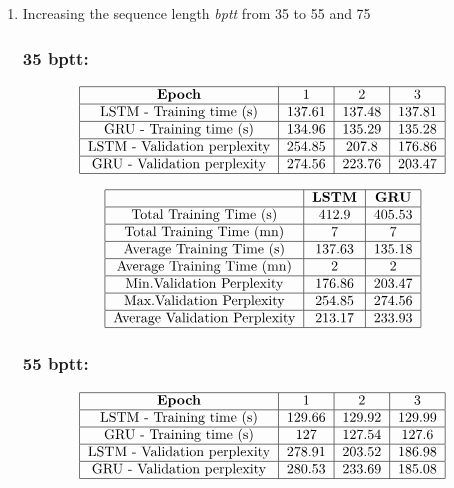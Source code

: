 \documentclass[11pt]{article}
\newcommand{\0}{\mat{0}}
\begin{document}
\begin{itemize}
\begin{enumerate}
	\item Increasing the sequence length \textit{bptt} from 35 to 55 and 75
	\subsubsection*{\textbf{35 bptt:}}
	  \[
  	 	\begin{tabular}{| c | c | c | c |}
  	 	 	\hline
	 	 		\textbf{Epoch} & 1 & 2 & 3  \\
	  	 	\hline
	 			LSTM - Training time (s)		& 137.61 & 137.48 & 137.81 \\
	 	 	\hline
				GRU - Training time (s)		& 134.96& 135.29 & 135.28 \\
			\hline 
				LSTM - Validation perplexity	& 254.85 & 207.8 & 176.86 \\
			\hline 
				GRU - Validation perplexity	& 274.56 & 223.76 & 203.47 \\
			\hline
		\end{tabular}
	\] 

	  \[
  	 	\begin{tabular}{| c | c | c |}
  	 	 	\hline
	 	 		& \textbf{LSTM} &  \textbf{GRU} \\
	  	 	\hline
	 			Total Training Time (s)		& 412.9 & 405.53 \\
	 	 	\hline
				Total Training Time (mn)		& 7 & 7 \\
			\hline 
				Average Training Time (s)	 	& 137.63 & 135.18 \\
			\hline 
				Average Training Time (mn)	& 2 & 2 \\
			\hline
				Min.Validation Perplexity		& 176.86 & 203.47 \\
			\hline
				Max.Validation Perplexity		& 254.85 & 274.56 \\
			\hline
				Average Validation Perplexity	& 213.17 & 233.93 \\
			\hline
		\end{tabular}
	\] 

	\subsubsection*{\textbf{55 bptt:}}
	  \[
  	 	\begin{tabular}{| c | c | c | c |}
  	 	 	\hline
	 	 		\textbf{Epoch} & 1 & 2 & 3  \\
	  	 	\hline
	 			LSTM - Training time (s)		& 129.66 & 129.92 & 129.99 \\
	 	 	\hline
				GRU - Training time (s)		& 127	& 127.54 & 127.6 \\
			\hline 
				LSTM - Validation perplexity	& 278.91	&  203.52 & 186.98\\
			\hline 
				GRU - Validation perplexity	& 280.53 & 233.69 & 185.08 \\
			\hline
		\end{tabular}
	\] 


\end{enumerate}
\end{itemize}
\end{document}
